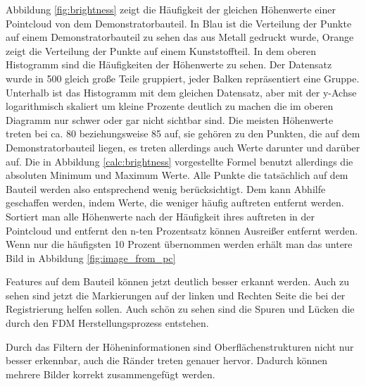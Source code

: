 \documentclass[../main.tex]{subfiles}
\begin{document}
Abbildung \ref*{fig:brightness} zeigt die Häufigkeit der gleichen Höhenwerte einer
Pointcloud von dem Demonstratorbauteil. In Blau ist die Verteilung der Punkte auf 
einem Demonstratorbauteil zu sehen das aus Metall gedruckt wurde, Orange zeigt die 
Verteilung der Punkte auf einem Kunststoffteil.
In dem oberen Histogramm 
sind die Häufigkeiten der Höhenwerte zu sehen. Der Datensatz wurde in 500 gleich große
Teile gruppiert, jeder Balken repräsentiert eine Gruppe.
Unterhalb ist das Histogramm mit dem gleichen Datensatz, aber mit der y-Achse 
logarithmisch skaliert um kleine Prozente deutlich zu machen die im
oberen Diagramm nur schwer oder gar nicht sichtbar sind. 
Die meisten Höhenwerte treten bei ca. 80 beziehungsweise 85 auf, 
sie gehören zu den Punkten, die auf dem Demonstratorbauteil liegen, 
es treten allerdings auch Werte darunter und darüber auf. 
Die in Abbildung \ref*{calc:brightness} vorgestellte Formel benutzt allerdings 
die absoluten Minimum und Maximum Werte.
Alle Punkte die tatsächlich auf dem Bauteil werden also entsprechend wenig
berücksichtigt. Dem kann Abhilfe geschaffen werden, indem Werte, die weniger häufig 
auftreten entfernt werden. Sortiert man alle Höhenwerte nach der Häufigkeit ihres 
auftreten in der Pointcloud und entfernt den n-ten Prozentsatz können Ausreißer 
entfernt werden. Wenn nur die häufigsten 10 Prozent übernommen werden erhält man 
das untere Bild in Abbildung \ref{fig:image_from_pc}

Features auf dem Bauteil können jetzt deutlich besser erkannt werden. Auch zu sehen
sind jetzt die Markierungen auf der linken und Rechten Seite die bei der Registrierung
helfen sollen. Auch schön zu sehen sind die Spuren und Lücken die durch den FDM 
Herstellungsprozess entstehen.

Durch das Filtern der Höheninformationen sind Oberflächenstrukturen nicht nur besser
erkennbar, auch die Ränder treten genauer hervor. 
Dadurch können mehrere Bilder korrekt zusammengefügt werden.
\end{document}
